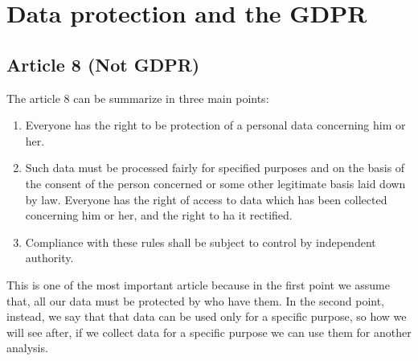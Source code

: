 \section{Data protection and the GDPR}
\subsection{Article 8 (Not GDPR)}
The article 8 can be summarize in three main points:
\begin{enumerate}
  \item Everyone has the right to be protection of a personal data concerning him or her.
  \item Such data must be processed fairly for specified purposes and on the basis of the consent of the person concerned or some other legitimate basis laid down by law. Everyone has the right of access to data which has been collected concerning him or her, and the right to ha it rectified.
  \item Compliance with these rules shall be subject to control by independent authority.
\end{enumerate}
This is one of the most important article because in the first point we assume that, all our data must be protected by who have them.
In the second point, instead, we say that that data can be used only for a specific purpose, so how we will see after, if we collect data for a specific purpose we can use them for another analysis.
